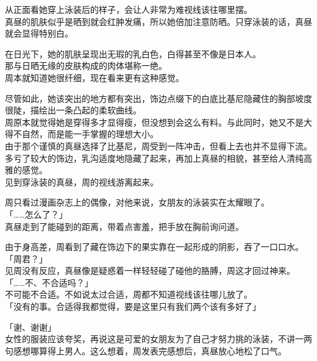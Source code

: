 从正面看她穿上泳装后的样子，会让人非常为难视线该往哪里摆。\\

真昼的肌肤似乎是晒到就会红肿发痛，所以她倍加注意防晒。只穿泳装的话，真昼就会显得特别白。

在日光下，她的肌肤呈现出无瑕的乳白色，白得甚至不像是日本人。\\

那与日晒无缘的皮肤构成的肉体堪称一绝。\\

周本就知道她很纤细，现在看来更有这种感觉。

尽管如此，她该突出的地方都有突出，饰边点缀下的白底比基尼隐藏住的胸部坡度很陡，描绘出一条凸起的柔软曲线。\\

周原本就觉得她是穿得多才显得瘦，但没想到会这么有料。与此同时，她又不是大得不自然，而是能一手掌握的理想大小。\\

由于那个谨慎的真昼选择了比基尼，周受到一阵冲击，但看上去也并不显得下流。多亏了较大的饰边，乳沟适度地隐藏了起来，再加上真昼的相貌，甚至给人清纯高雅的感觉。\\

见到穿泳装的真昼，周的视线游离起来。

周只看过漫画杂志上的偶像，对他来说，女朋友的泳装实在太耀眼了。\\

「……怎么了？」\\

真昼走到了能碰到的距离，带着点害羞，把手放在胸前询问道。

由于身高差，周看到了藏在饰边下的果实靠在一起形成的阴影，吞了一口口水。\\

「周君？」\\

见周没有反应，真昼像是疑惑着一样轻轻碰了碰他的胳膊，周这才回过神来。\\

「……不、不合适吗？」\\

不可能不合适。不如说太过合适，周都不知道视线该往哪儿放了。\\

「没有的事。合适得我都觉得，要是这里只有我们两个该有多好了」

「谢、谢谢」\\

女性的服装应该夸奖，再说这是可爱的女朋友为了自己才努力挑的泳装，不讲一两句感想哪算得上男人。这么想着，周发表完感想后，真昼放心地松了口气。\\


